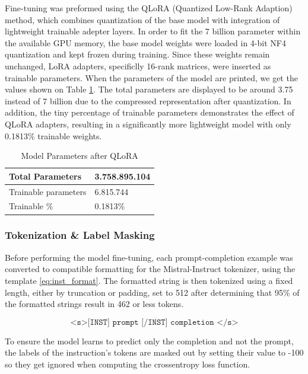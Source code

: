 Fine-tuning was preformed using the QLoRA (Quantized Low-Rank Adaption) method, which combines quantization of the base model with integration of lightweight trainable adepter layers. In order to fit the 7 billion parameter within the available GPU memory, the base model weights were loaded in 4-bit NF4 quantization and kept frozen during training. Since these weights remain unchanged, LoRA adapters, specificlly 16-rank matrices, were inserted as trainable parameters. When the parameters of the model are printed, we get the values shown on Table \ref{tab:qlora}. The total parameters are displayed to be around 3.75 instead of 7 billion due to the compressed representation after quantization. In addition, the tiny percentage of trainable parameters demonstrates the effect of QLoRA adapters, resulting in a significantly more lightweight model with only 0.1813\% trainable weights.\\

\begin{table}[ht!]
    \centering
    \begin{tabular}{|p{5cm}|p{5cm}|}
        \hline
        Total Parameters & 3.758.895.104 \\
        \hline
        Trainable parameters & 6.815.744 \\ \hline
        Trainable \% & 0.1813\% \\ \hline
    \end{tabular}
    \caption{Model Parameters after QLoRA}
    \label{tab:qlora}
\end{table}


\subsubsection{Tokenization \& Label Masking}

Before performing the model fine-tuning, each prompt-completion example was converted to compatible formatting for the Mistral-Instruct tokenizer, using the template \ref{eq:inst_format}. The formatted string is then tokenized using a fixed length, either by truncation or padding, set to 512 after determining that 95\% of the formatted strings result in 462 or less tokens.

\begin{equation}
    \texttt{<s>[INST] {prompt} [/INST] {completion} </s>}
    \label{eq:inst_format}
\end{equation}

To ensure the model learns to predict only the completion and not the prompt, the labels of the instruction's tokens are masked out by setting their value to -100 so they get ignored when computing the crossentropy loss function.


